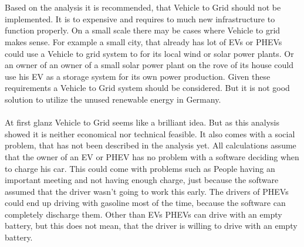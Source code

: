\begin{parcolumns}[colwidths={1=2.5 cm, 2=10 cm, 3=2.5cm}]{3}
{\\ \\
\noindent
Based on the analysis it is recommended, that Vehicle to Grid should not be implemented. It is to expensive and requires to much new infrastructure to function properly. On a small scale there may be cases where Vehicle to grid makes sense. For example a small city, that already has lot of EVs or PHEVs could use a Vehicle to grid system to for its local wind or solar power plants. Or an owner of an owner of a small solar power plant on the rove of its house could use his EV as a storage system for its own power production. Given these requirements a Vehicle to Grid system should be considered. But it is not good solution to utilize the unused renewable energy in Germany.
\\ \\
\noindent
At first glanz Vehicle to Grid seems like a brilliant idea. But as this analysis showed it is neither economical nor technical feasible. It also comes with a social problem, that has not been described in the analysis yet. All calculations assume that the owner of an EV or PHEV has no problem with a software deciding when to charge his car. This could come with problems such as People having an important meeting and not having enough charge, just because the software assumed that the driver wasn't going to work this early. The drivers of PHEVs could end up driving with gasoline most of the time, because the software can completely discharge them. Other than EVs PHEVs can drive with an empty battery, but this does not mean, that the driver is willing to drive with an empty battery.
}


\end{parcolumns}
